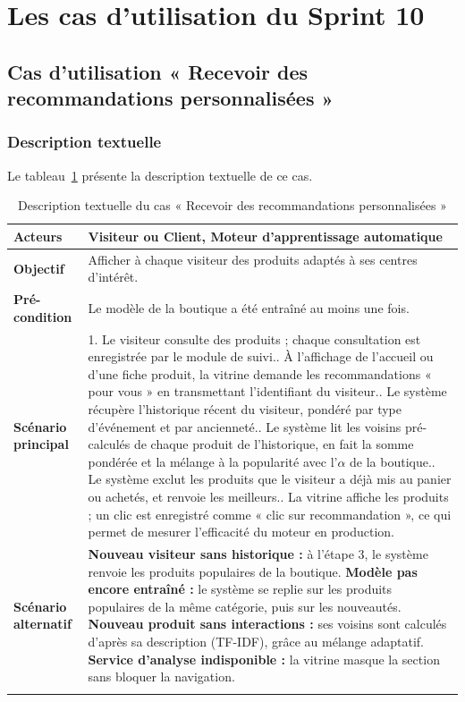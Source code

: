 \section{Les cas d'utilisation du Sprint 10}
\subsection{Cas d'utilisation « Recevoir des recommandations personnalisées »}
\subsubsection{Description textuelle}
Le tableau~\ref{tab:uc-reco} présente la description textuelle de ce cas.
\renewcommand{\arraystretch}{1.5}
\begin{longtable}{|p{4cm}|p{11cm}|}
\hline
\textbf{Acteurs} & Visiteur ou Client, Moteur d'apprentissage automatique \\
\hline
\textbf{Objectif} & Afficher à chaque visiteur des produits adaptés à ses centres d'intérêt. \\
\hline
\textbf{Pré-condition} & Le modèle de la boutique a été entraîné au moins une fois. \\
\hline
\textbf{Scénario principal} &
1. Le visiteur consulte des produits ; chaque consultation est enregistrée par le module de suivi.\newline
2. À l'affichage de l'accueil ou d'une fiche produit, la vitrine demande les recommandations « pour vous » en transmettant l'identifiant du visiteur.\newline
3. Le système récupère l'historique récent du visiteur, pondéré par type d'événement et par ancienneté.\newline
4. Le système lit les voisins pré-calculés de chaque produit de l'historique, en fait la somme pondérée et la mélange à la popularité avec l'$\alpha$ de la boutique.\newline
5. Le système exclut les produits que le visiteur a déjà mis au panier ou achetés, et renvoie les meilleurs.\newline
6. La vitrine affiche les produits ; un clic est enregistré comme « clic sur recommandation », ce qui permet de mesurer l'efficacité du moteur en production. \\
\hline
\textbf{Scénario alternatif} &
\textbf{Nouveau visiteur sans historique :} à l'étape 3, le système renvoie les produits populaires de la boutique.\newline
\textbf{Modèle pas encore entraîné :} le système se replie sur les produits populaires de la même catégorie, puis sur les nouveautés.\newline
\textbf{Nouveau produit sans interactions :} ses voisins sont calculés d'après sa description (TF-IDF), grâce au mélange adaptatif.\newline
\textbf{Service d'analyse indisponible :} la vitrine masque la section sans bloquer la navigation. \\
\hline
\caption{Description textuelle du cas « Recevoir des recommandations personnalisées »}
\label{tab:uc-reco}
\end{longtable}

